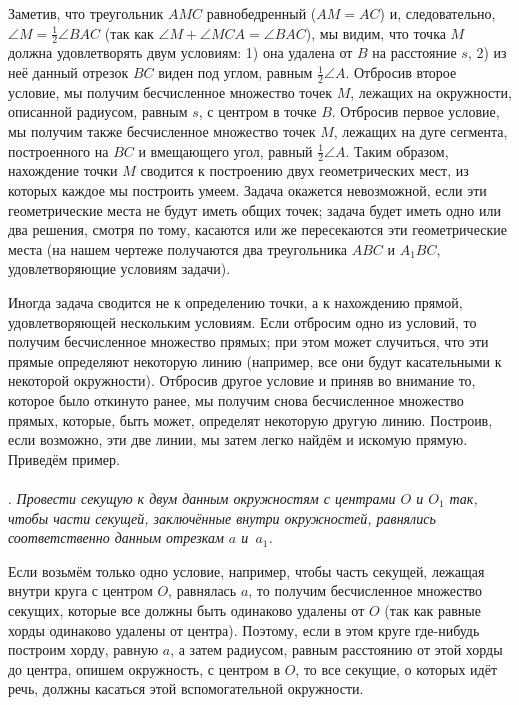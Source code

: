 \documentclass[twoside]{book}
\begin{document}
Заметив, что треугольник $AMC$ равнобедренный ($AM=AC$) и, следовательно, $\angle M =  \tfrac12\angle BAC$ (так как $\angle M+\angle MCA = \angle BAC$), мы видим, что точка $M$ должна удовлетворять двум условиям:
1) она удалена от $B$ на расстояние $s$, 
2) из неё данный отрезок $BC$ виден под углом, равным $\tfrac12\angle A$.
Отбросив второе условие, мы получим бесчисленное множество точек $M$, лежащих на окружности, описанной радиусом, равным $s$, с центром в точке $B$.
Отбросив первое условие, мы получим также бесчисленное множество точек $M$, лежащих на дуге сегмента, построенного на $BC$ и вмещающего угол, равный $\tfrac12\angle A$.
Таким образом, нахождение точки $M$ сводится к построению двух геометрических мест, из которых каждое мы построить умеем.
Задача окажется невозможной, если эти геометрические места не будут иметь общих точек;
задача будет иметь одно или два решения, смотря по тому, касаются или же пересекаются эти геометрические места (на нашем чертеже получаются два треугольника $ABC$ и $A_1BC$, удовлетворяющие условиям задачи).

\medskip

Иногда задача сводится не к определению точки, а к нахождению прямой, удовлетворяющей нескольким условиям.
Если отбросим одно из условий, то получим бесчисленное множество прямых;
при этом может случиться, что эти прямые определяют некоторую линию (например, все они будут касательными к некоторой окружности).
Отбросив другое условие и приняв во внимание то, которое было откинуто ранее, мы получим снова бесчисленное множество прямых, которые, быть может, определят некоторую другую линию.
Построив, если возможно, эти две линии, мы затем легко найдём и искомую прямую.
Приведём пример.

\paragraph{}\label{1938/135}
.
\emph{Провести секущую к двум данным окружностям с центрами $O$ и $O_1$ так, чтобы части секущей, заключённые внутри окружностей, равнялись соответственно данным отрезкам $a$ и~$a_1$.}


Если возьмём только одно условие, например, чтобы часть секущей, лежащая внутри круга  с центром $O$, равнялась $a$, то получим бесчисленное множество секущих, которые все должны быть одинаково удалены от $O$ (так как равные хорды одинаково удалены от центра).
Поэтому, если в этом круге где-нибудь построим хорду, равную $a$, а затем радиусом, равным расстоянию от этой хорды до центра, опишем окружность, с центром в $O$, то все секущие, о которых идёт речь, должны касаться этой вспомогательной окружности.
\end{document}

